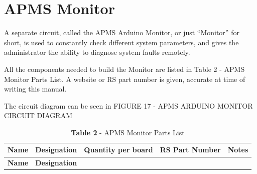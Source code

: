 \documentclass[
  letterpaper,
]{scrbook}
\begin{document}
\chapter{APMS Monitor}\label{apms-monitor}

A separate circuit, called the APMS Arduino Monitor, or just ``Monitor''
for short, is used to constantly check different system parameters, and
gives the administrator the ability to diagnose system faults remotely.

All the components needed to build the Monitor are listed in Table 2 -
APMS Monitor Parts List. A website or RS part number is given, accurate
at time of writing this manual.

The circuit diagram can be seen in FIGURE 17 - APMS ARDUINO MONITOR
CIRCUIT DIAGRAM

\begin{longtable}[]{@{}
  >{\raggedright\arraybackslash}p{}
  >{\raggedright\arraybackslash}p{}
  >{\raggedright\arraybackslash}p{}
  >{\raggedright\arraybackslash}p{}
  >{\raggedright\arraybackslash}p{}@{}}
\caption{\textbf{Table 2} - APMS Monitor Parts List}\tabularnewline
\toprule\noalign{}
\begin{minipage}[b]{\linewidth}\raggedright
\textbf{Name}
\end{minipage} & \begin{minipage}[b]{\linewidth}\raggedright
\textbf{Designation}
\end{minipage} & \begin{minipage}[b]{\linewidth}\raggedright
\textbf{Quantity per board}
\end{minipage} & \begin{minipage}[b]{\linewidth}\raggedright
\textbf{RS Part Number}
\end{minipage} & \begin{minipage}[b]{\linewidth}\raggedright
\textbf{Notes}
\end{minipage} \\
\midrule\noalign{}
\endfirsthead
\toprule\noalign{}
\begin{minipage}[b]{\linewidth}\raggedright
\textbf{Name}
\end{minipage} & \begin{minipage}[b]{\linewidth}\raggedright
\textbf{Designation}
\end{minipage} & \begin{minipage}[b]{\linewidth}\raggedright

\end{minipage}
\end{longtable}
\end{document}

